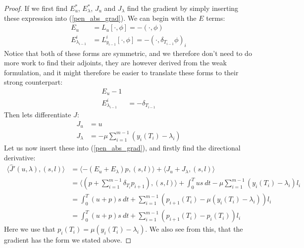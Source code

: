 \documentclass[11pt,a4paper]{article}
\begin{document}
\begin{proof}
If we first find $E_u^*$, $E_{\lambda}^*$, $J_u$ and $J_{\lambda}$ find the gradient by simply inserting these expression into (\ref{pen_abs_grad}). We can begin with the $E$ terms:
\begin{align*}
E_u &= L_u[\cdot,\phi] = -(\cdot,\phi) \\
E_{\lambda_{i-1}}^i &= L_{y_{i-1}}^i[\cdot,\phi] = -(\cdot,\delta_{T_{i-1}}\phi)_i
\end{align*}
Notice that both of these forms are symmetric, and we therefore don't need to do more work to find their adjoints, they are however derived from the weak formulation, and it might therefore be easier to translate these forms to their strong counterpart:
\begin{align*}
E_u -1 \\
E_{\lambda_{i-1}}^i &= -\delta_{T_{i-1}}
\end{align*}
Then lets differentiate $J$:
\begin{align*}
J_u &= u \\
J_{\lambda} &= - \mu \sum_{i=1}^{m-1}(y_{i}(T_i)-\lambda_i)
\end{align*}
Let us now insert these into (\ref{pen_abs_grad}), and firstly find the directional derivative:
\begin{align*}
\langle \hat{J}'(u,\lambda), (s,l)\rangle&=\langle -(E_u+E_{\lambda})p, (s,l)\rangle + \langle J_u+J_{\lambda}, (s,l)\rangle \\
&= \langle (p+\sum_{i=1}^{m-1} \delta_{T_i}p_{i+1}) , (s,l)\rangle+ \int_0^T us \ dt - \mu \sum_{i=1}^{m-1}(y_{i}(T_i)-\lambda_i)l_i\\
&=\int_0^T (u+p)s \ dt +\sum_{i=1}^{m-1}(p_{i+1}(T_i) -\mu(y_{i}(T_i)-\lambda_i) )l_i \\
&= \int_0^T (u+p)s \ dt +\sum_{i=1}^{m-1}(p_{i+1}(T_i) -p_{i}(T_i) )l_i
\end{align*} 
Here we use that $p_i(T_i) = \mu(y_{i}(T_i)-\lambda_i)$. We also see from this, that the gradient has the form we stated above.
\end{proof} 
\end{document}
